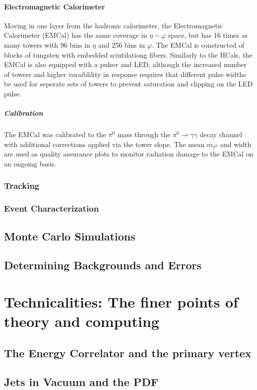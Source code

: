\documentclass[letterpaper, 12pt, oneside]{book}
\theoremstyle{definition}
\begin{document}
	\subsection{Electromagnetic Calorimeter}
		Moving in one layer from the hadronic calorimeter, the Electromagnetic Calorimeter (EMCal) has the same coverage in $\eta-\varphi$ space,
		but has 16 times as many towers with 96 bins in $\eta$ and 256 bins in $\varphi$. 
		The EMCal is constructed of blocks of tungsten with embedded scintilationg fibers. 
		Similarly to the HCals, the EMCal is also equipped with a pulser and LED, although the increased number of towers and higher varaiblility 
		in response requires that different pulse widths be used for seperate sets of towers to prevent saturation and clipping on the LED pulse.
		\subsubsection{Calibration}
			The EMCal was calibrated to the $\pi^0$ mass through the $\pi^0 \rightarrow \gamma \gamma$ decay channel with additional corrections
			applied via the tower slope. 
			The mean $m_{\pi^0}$ and width are used as quality assurance plots to monitor radiation damage to the EMCal on an ongoing basis.

\section{Tracking}
\section{Event Characterization}
\chapter{Monte Carlo Simulations}
\chapter{Determining Backgrounds and Errors}
\part{Technicalities: The finer points of theory and computing}
\chapter{The Energy Correlator and the primary vertex}
\chapter{Jets in Vacuum and the PDF}
\end{document}
